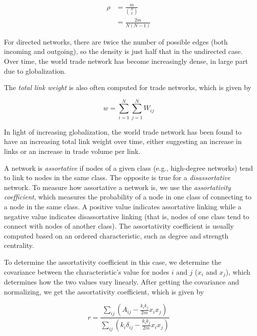 \documentclass[12pt,letterpaper]{report}
\begin{document}
	\begin{equation}
	\begin{aligned}
	\label{eqn:317density} \rho &= \frac{m}{{N \choose 2}} \\
	&= \frac{2m}{N(N - 1)}
	\end{aligned}
	\end{equation}
	
	For directed networks, there are twice the number of possible edges (both incoming and outgoing), so the density is just half that in the undirected case. Over time, the world trade network has become increasingly dense, in large part due to globalization. \cite{cepeda2019evolution}

	The \textit{total link weight} is also often computed for trade networks, which is given by
	
	\begin{equation}
	\label{eqn:318totalWeight} w = \sum_{i = 1}^{N}\sum_{j = 1}^{N} W_{ij}
	\end{equation}
	
	In light of increasing globalization, the world trade network has been found to have an increasing total link weight over time, either suggesting an increase in links or an increase in trade volume per link. \cite{cepeda2019evolution}
	
	A network is \textit{assortative} if nodes of a given class (e.g., high-degree networks) tend to link to nodes in the same class. The opposite is true for a \textit{disassortative} network. To measure how assortative a network is, we use the \textit{assortativity coefficient}, which measures the probability of a node in one class of connecting to a node in the same class. A positive value indicates assortative linking while a negative value indicates disassortative linking (that is, nodes of one class tend to connect with nodes of another class). The assortativity coefficient is usually computed based on an ordered characteristic, such as degree and strength centrality.
	
	To determine the assortativity coefficient in this case, we determine the covariance between the characteristic’s value for nodes $i$ and $j$ ($x_{i}$ and $x_{j}$), which determines how the two values vary linearly. After getting the covariance and normalizing, we get the assortativity coefficient, which is given by
	
	\begin{equation}
	\label{eqn:319degreeAssortativity} r = \frac{\sum_{ij}(A_{ij} - \frac{k_{i}k_{j}}{2m}x_{i}x_{j})}{\sum_{ij}(k_{i} \delta_{ij} - \frac{k_{i}k_{j}}{2m}x_{i}x_{j})}
	\end{equation}
	
\end{document}
